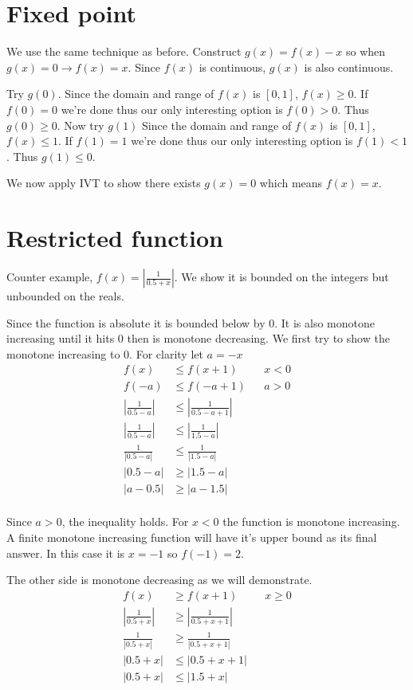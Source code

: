 \documentclass{article}
\begin{document}
\section{Fixed point}
We use the same technique as before. Construct $g(x) = f(x) - x$ so when
$g(x) = 0 \to f(x) = x$. Since $f(x)$ is continuous, $g(x)$ is also continuous.

Try $g(0)$.
Since the domain and range of $f(x)$ is $[0,1]$, $f(x) \geq 0$.
If $f(0) = 0$ we're done thus our only interesting option is $f(0) > 0$.
Thus $g(0) \geq 0$.
Now try $g(1)$
Since the domain and range of $f(x)$ is $[0,1]$, $f(x) \leq 1$.
If $f(1) = 1$ we're done thus our only interesting option is $f(1) < 1$.
Thus $g(1) \leq 0$.

We now apply IVT to show there exists $g(x) = 0$ which means $f(x) = x$.

\section{Restricted function}
Counter example, $f(x) = \left|\frac{1}{0.5 + x}\right|$.
We show it is bounded on the integers but unbounded on the reals.

Since the function is absolute it is bounded below by 0. It is also monotone
increasing until it hits 0 then is monotone decreasing. We first try to show
the monotone increasing to 0. For clarity let $a = -x$
\begin{align*}
    f(x) &\leq f(x+1) && x < 0 \\
    f(-a) &\leq f(-a+1) && a > 0 \\
    \left|\frac{1}{0.5 - a}\right| &\leq \left|\frac{1}{0.5 - a + 1}\right| \\
    \left|\frac{1}{0.5 - a}\right| &\leq \left|\frac{1}{1.5 - a}\right| \\
    \frac{1}{\left|0.5 - a\right|} &\leq \frac{1}{\left|1.5 - a\right|} \\
    \left|0.5 - a\right| &\geq \left|1.5 - a\right| \\
    \left|a - 0.5\right| &\geq \left|a - 1.5\right| \\
\end{align*}

Since $a > 0$, the inequality holds. For $x < 0$ the function is monotone
increasing. A finite monotone increasing function will have it's upper bound
as its final answer. In this case it is $x=-1$ so $f(-1) = 2$.

The other side is monotone decreasing as we will demonstrate.
\begin{align*}
    f(x) &\geq f(x+1) && x \geq 0 \\
    \left|\frac{1}{0.5 + x}\right| &\geq \left|\frac{1}{0.5 + x + 1}\right| \\
    \frac{1}{\left|0.5 + x\right|} &\geq \frac{1}{\left|0.5 + x + 1\right|} \\
    \left|0.5 + x\right| &\leq \left|0.5 + x + 1\right| \\
    \left|0.5 + x\right| &\leq \left|1.5 + x\right| \\
\end{align*}
\end{document}
